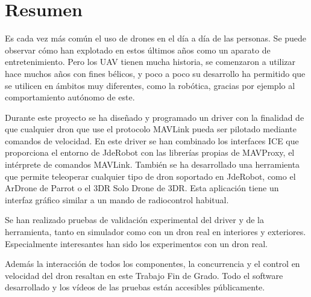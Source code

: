 \chapter*{Resumen}

\hspace{1cm} Es cada vez más común el uso de drones en el día a día de las personas. Se puede observar cómo han explotado en estos últimos años como un aparato de entretenimiento. Pero los UAV tienen mucha historia, se comenzaron a utilizar hace muchos años con fines bélicos, y poco a poco su desarrollo ha permitido que se utilicen en ámbitos muy diferentes, como la robótica, gracias por ejemplo al comportamiento autónomo de este.

\hspace{1cm} Durante este proyecto se ha diseñado y programado un driver con la finalidad de que cualquier dron que use el protocolo MAVLink pueda ser pilotado mediante comandos de velocidad. En este driver se han combinado los interfaces ICE que proporciona el entorno de JdeRobot con las librerías propias de MAVProxy, el intérprete de comandos MAVLink. También se ha desarrollado una herramienta que permite teleoperar cualquier tipo de dron soportado en JdeRobot, como el ArDrone de Parrot o el 3DR Solo Drone de 3DR. Esta aplicación tiene un interfaz gráfico similar a un mando de radiocontrol habitual.

\hspace{1cm} Se han realizado pruebas de validación experimental del driver y de la herramienta, tanto en simulador como con un dron real en interiores y exteriores. Especialmente interesantes han sido los experimentos con un dron real.

\hspace{1cm} Además la interacción de todos los componentes, la concurrencia y el control en velocidad del dron resaltan en este Trabajo Fin de Grado. Todo el software desarrollado y los vídeos de las pruebas están accesibles p\'ublicamente. 

